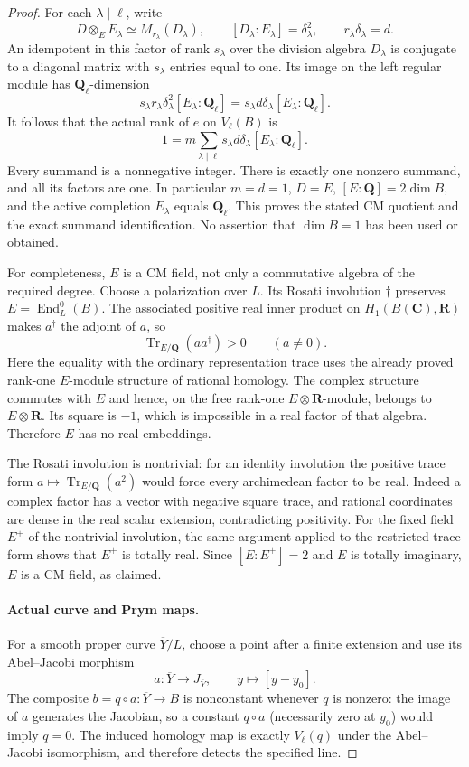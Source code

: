 \begin{proof}
For each $\lambda\mid\ell$, write
\[
 D\otimes_E E_\lambda\simeq M_{r_\lambda}(D_\lambda),\qquad
 [D_\lambda:E_\lambda]=\delta_\lambda^2,\qquad
 r_\lambda\delta_\lambda=d.
\]
An idempotent in this factor of rank $s_\lambda$ over the division
algebra $D_\lambda$ is conjugate to a diagonal matrix with
$s_\lambda$ entries equal to one. Its image on the left regular module
has $\mathbf Q_\ell$-dimension
\[
 s_\lambda r_\lambda\delta_\lambda^2[E_\lambda:\mathbf Q_\ell]
 =s_\lambda d\delta_\lambda[E_\lambda:\mathbf Q_\ell].
\]
It follows that the actual rank of $e$ on $V_\ell(B)$ is
\[
 1=m\sum_{\lambda\mid\ell}
 s_\lambda d\delta_\lambda[E_\lambda:\mathbf Q_\ell].
\]
Every summand is a nonnegative integer. There is exactly one nonzero
summand, and all its factors are one. In particular $m=d=1$,
$D=E$, $[E:\mathbf Q]=2\dim B$, and the active completion
$E_\lambda$ equals $\mathbf Q_\ell$. This proves the stated CM quotient
and the exact summand identification. No assertion that $\dim B=1$
has been used or obtained.

For completeness, $E$ is a CM field, not only a commutative algebra
of the required degree. Choose a polarization over $L$. Its Rosati
involution $\dagger$ preserves $E=\operatorname{End}^0_L(B)$.
The associated positive real inner product on $H_1(B(\mathbf C),\mathbf R)$
makes $a^\dagger$ the adjoint of $a$, so
\[
 \operatorname{Tr}_{E/\mathbf Q}(aa^\dagger)>0\qquad(a\ne0).
\]
Here the equality with the ordinary representation trace uses the
already proved rank-one $E$-module structure of rational homology.
The complex structure commutes with $E$ and hence, on the free
rank-one $E\otimes\mathbf R$-module, belongs to $E\otimes\mathbf R$.
Its square is $-1$, which is impossible in a real factor of that
algebra. Therefore $E$ has no real embeddings.

The Rosati involution is nontrivial: for an identity involution the
positive trace form $a\mapsto\operatorname{Tr}_{E/\mathbf Q}(a^2)$
would force every archimedean factor to be real. Indeed a complex
factor has a vector with negative square trace, and rational
coordinates are dense in the real scalar extension, contradicting
positivity. For the fixed field $E^+$ of the nontrivial involution,
the same argument applied to the restricted trace form shows that
$E^+$ is totally real. Since $[E:E^+]=2$ and $E$ is totally imaginary,
$E$ is a CM field, as claimed.

\paragraph{Actual curve and Prym maps.}
For a smooth proper curve $\overline Y/L$, choose a point after a finite
extension and use its Abel--Jacobi morphism
\[
 a:\overline Y\longrightarrow J_{\overline Y},\qquad
 y\longmapsto[y-y_0].
\]
The composite $b=q\circ a:\overline Y\to B$ is nonconstant whenever
$q$ is nonzero: the image of $a$ generates the Jacobian, so a constant
$q\circ a$ (necessarily zero at $y_0$) would imply $q=0$.
The induced homology map is exactly $V_\ell(q)$ under the Abel--Jacobi
isomorphism, and therefore detects the specified line.


\end{proof}
